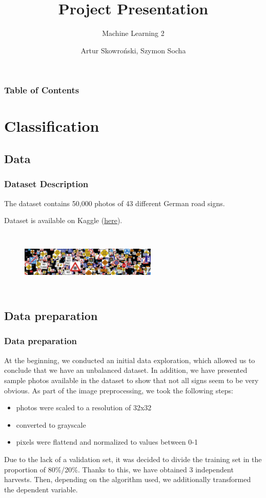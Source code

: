 \documentclass[8pt]{beamer}
\title[Machine-Learining-2\_Project-Presentation\_AS-SS] %
{Project Presentation}
\subtitle{Machine Learning 2}
\author[Artur Skowroński, Szymon Socha] %
{Artur Skowroński, Szymon Socha}
\date[date] %
\begin{document}
\frame{\titlepage}


\begin{frame}
\frametitle{Table of Contents}
\tableofcontents
\end{frame}


\section{Classification}

\subsection{Data}
\begin{frame}
\frametitle{Dataset Description}
The dataset contains 50,000 photos of 43 different German road signs.

Dataset is available on Kaggle (\href{https://www.kaggle.com/datasets/meowmeowmeowmeowmeow/gtsrb-german-traffic-sign}{\underline{here}}).
\begin{figure}[t]
\includegraphics[width=6.5cm, height=3cm]{road-signs.jpg}
\centering
\end{figure}

\end{frame}

\subsection{Data preparation}
\begin{frame}
\frametitle{Data preparation}
At the beginning, we conducted an initial data exploration, which allowed us to conclude that we have an unbalanced dataset. In addition, we have presented sample photos available in the dataset to show that not all signs seem to be very obvious.
As part of the image preprocessing, we took the following steps:
\begin{itemize}
    \item<1-> photos were scaled to a resolution of 32x32
    \item<1-> converted to grayscale
    \item<1-> pixels were flattend and normalized to values between 0-1 
\end{itemize}
Due to the lack of a validation set, it was decided to divide the training set in the proportion of 80\%/20\%. Thanks to this, we have obtained 3 independent harvests.
Then, depending on the algorithm used, we additionally transformed the dependent variable.
\end{frame}
\end{document}
